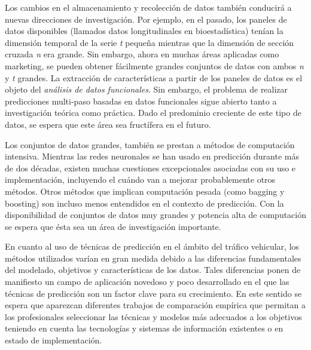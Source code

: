 \documentclass{llncs}
\begin{document}
Los cambios en el almacenamiento y recolección de datos también conducirá a nuevas direcciones de investigación. Por ejemplo, en el pasado, los paneles de datos disponibles (llamados datos longitudinales en bioestadística) tenían la dimensión temporal de la serie \emph{t} pequeña mientras que la dimensión de sección cruzada \emph{n} era grande. Sin embargo, ahora en muchas áreas aplicadas como marketing, se pueden obtener fácilmente grandes conjuntos de datos con ambos \emph{n} y \emph{t} grandes. La extracción de características a partir de los paneles de datos es el objeto del \emph{análisis de datos funcionales}. Sin embargo, el problema de realizar predicciones multi-paso basadas en datos funcionales sigue abierto tanto a investigación teórica como práctica. Dado el predominio creciente de este tipo de datos, se espera que este área sea fructífera en el futuro.

Los conjuntos de datos grandes, también se prestan a métodos de computación intensiva. Mientras las redes neuronales se han usado en predicción durante más de dos décadas, existen muchas cuestiones excepcionales asociadas con su uso e implementación, incluyendo el cuándo van a mejorar probablemente otros métodos. Otros métodos que implican computación pesada (como bagging y boosting) son incluso menos entendidos en el contexto de predicción. Con la disponibilidad de conjuntos de datos muy grandes y potencia alta de computación se espera que ésta sea un área de investigación importante.

En cuanto al uso de técnicas de predicción en el ámbito del tráfico vehicular, los métodos utilizados varían en gran medida debido a las diferencias fundamentales del modelado, objetivos y características de los datos. Tales diferencias ponen de manifiesto un campo de aplicación novedoso y poco desarrollado en el que las técnicas de predicción son un factor clave para su crecimiento. En este sentido se espera que aparezcan diferentes trabajos de comparación empírica que permitan a los profesionales seleccionar las técnicas y modelos más adecuados a los objetivos teniendo en cuenta las tecnologías y sistemas de información existentes o en estado de implementación.





\end{document}
